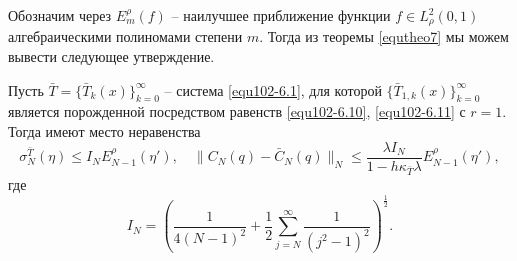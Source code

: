 Обозначим через $E^\rho_ m(f)$ -- наилучшее приближение функции $f\in L^2_\rho(0,1)$ алгебраическими полиномами степени $m$. Тогда из теоремы \ref{equtheo7} мы можем вывести следующее утверждение.
\begin{corollary}
  Пусть $\bar T=\{\bar T_k(x)\}_{k=0}^\infty$ -- система  \eqref{equ102-6.1}, для которой  $\{\bar T_{1,k}(x)\}_{k=0}^\infty$  является порожденной посредством равенств \eqref{equ102-6.10}, \eqref{equ102-6.11} с $r=1$. Тогда   имеют место неравенства
$$
\sigma^{\bar T}_N(\eta)\le I_NE^\rho_ {N-1}(\eta'),\quad\|C_N(q)-\bar C_N(q)\|_N\le \frac{\lambda I_N}{1-h\kappa_{\bar T}\lambda}E^\rho_ {N-1}(\eta'),
$$
где
$$
I_N=\left(\frac{1}{4(N-1)^2}+\frac12\sum_{j=N}^{\infty}\frac{1}{(j^2-1)^2}\right)^\frac12.
 $$
\end{corollary}
% 